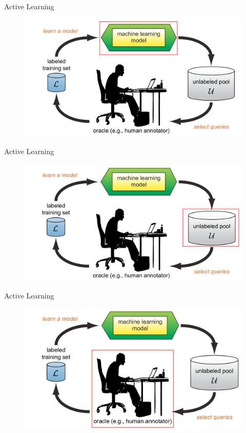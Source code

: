 \documentclass[10pt]{beamer}
\begin{document}
\begin{frame}[fragile]{Active Learning}
    \begin{figure}[htp]
        \centering
        \includegraphics[scale=0.3]{images/active_learning_ml_model.png}
    \end{figure}
\end{frame}

\begin{frame}[fragile]{Active Learning}
    \begin{figure}[htp]
        \centering
        \includegraphics[scale=0.3]{images/active_learning_unlabeled.png}
    \end{figure}
\end{frame}

\begin{frame}[fragile]{Active Learning}
    \begin{figure}[htp]
        \centering
        \includegraphics[scale=0.3]{images/active_learning_oracle.png}
    \end{figure}
\end{frame}
\end{document}

